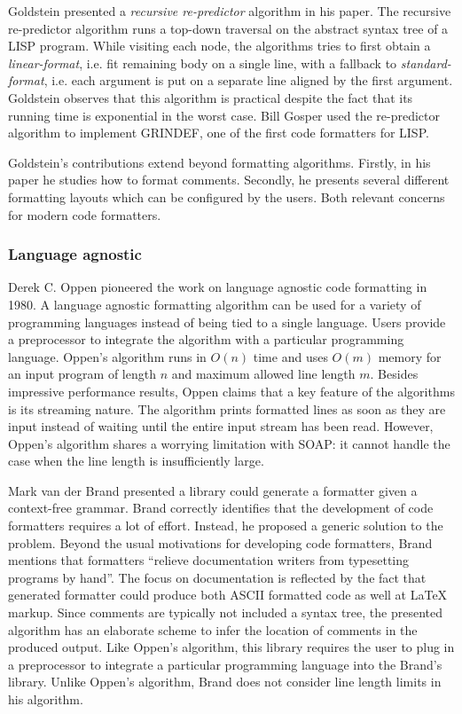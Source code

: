 Goldstein presented a \emph{recursive re-predictor} algorithm in his paper.
The recursive re-predictor algorithm runs a top-down traversal on the abstract syntax tree of a LISP program.
While visiting each node, the algorithms tries to first obtain a \emph{linear-format},
i.e. fit remaining body on a single line,
with a fallback to \emph{standard-format},
i.e. each argument is put on a separate line aligned by the first argument.
Goldstein observes that this algorithm is practical despite the fact that its running time is exponential in the worst case.
Bill Gosper used the re-predictor algorithm to implement GRINDEF\autocite{_bill_????}, one of the first code formatters for LISP.

Goldstein's contributions extend beyond formatting algorithms.
Firstly, in his paper he studies how to format comments.
Secondly, he presents several different formatting layouts which can be configured by the users.
Both relevant concerns for modern code formatters.

\subsubsection{Language agnostic}\label{sec:agnostic}
Derek C. Oppen pioneered the work on language agnostic code formatting in 1980\autocite{oppen_prettyprinting_1980}.
A language agnostic formatting algorithm can be used for a variety of programming languages instead of being
tied to a single language.
Users provide a preprocessor to integrate the algorithm with a particular programming language.
Oppen's algorithm runs in $O(n)$ time and uses $O(m)$ memory for an input program of length $n$ and maximum allowed line length $m$.
Besides impressive performance results, Oppen claims that a key feature of the algorithms is its streaming nature.
The algorithm prints formatted lines as soon as they are input instead of waiting until the entire input stream has been read.
However, Oppen's algorithm shares a worrying limitation with SOAP: it cannot handle the case when the line length is insufficiently large.

Mark van der Brand presented a library could generate a formatter given a context-free grammar\autocite{van_den_brand_generation_1996}.
Brand correctly identifies that the development of code formatters requires a lot of effort.
Instead, he proposed a generic solution to the problem.
Beyond the usual motivations for developing code formatters, Brand mentions that formatters ``relieve documentation writers from typesetting programs by hand''.
The focus on documentation is reflected by the fact that generated formatter could produce both ASCII formatted code as well at \LaTeX{} markup.
Since comments are typically not included a syntax tree, the presented algorithm has an elaborate scheme to infer the location of comments in the produced output.
Like Oppen's algorithm, this library requires the user to plug in a preprocessor to integrate a particular programming language into the Brand's library.
Unlike Oppen's algorithm, Brand does not consider line length limits in his algorithm.

